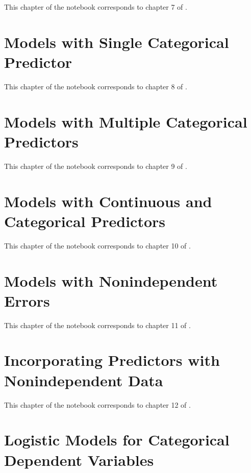 \documentclass[
]{book}
\begin{document}
This chapter of the notebook corresponds to chapter 7 of \citet{judd2017data}.

\hypertarget{singlecat}{%
\chapter{Models with Single Categorical Predictor}\label{singlecat}}

This chapter of the notebook corresponds to chapter 8 of \citet{judd2017data}.

\hypertarget{multicat}{%
\chapter{Models with Multiple Categorical Predictors}\label{multicat}}

This chapter of the notebook corresponds to chapter 9 of \citet{judd2017data}.

\hypertarget{ancova}{%
\chapter{Models with Continuous and Categorical Predictors}\label{ancova}}

This chapter of the notebook corresponds to chapter 10 of \citet{judd2017data}.

\hypertarget{nonindependent}{%
\chapter{Models with Nonindependent Errors}\label{nonindependent}}

This chapter of the notebook corresponds to chapter 11 of \citet{judd2017data}.

\hypertarget{incorporating-predictors-with-nonindependent-data}{%
\chapter{Incorporating Predictors with Nonindependent Data}\label{incorporating-predictors-with-nonindependent-data}}

This chapter of the notebook corresponds to chapter 12 of \citet{judd2017data}.

\hypertarget{logistic-models-for-categorical-dependent-variables}{%
\chapter{Logistic Models for Categorical Dependent Variables}\label{logistic-models-for-categorical-dependent-variables}}
\end{document}
